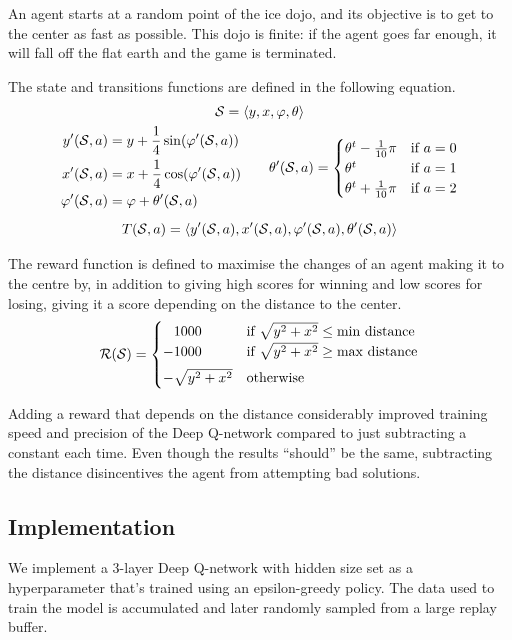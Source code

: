An agent starts at a random point of the ice dojo, and its objective is to get to the center as fast as possible.
This dojo is finite: if the agent goes far enough, it will fall off the flat earth and the game is terminated.

The state and transitions functions are defined in the following equation.
\newcommand{\statet}{\left< y, x, \varphi, \theta \right>}
\begin{gather*}
	\state = \statet \\
	\begin{aligned}
		y'(\state, a) &= y + \frac{1}{4} \sin(\varphi'(\state, a)) \\
		x'(\state, a) &= x + \frac{1}{4} \cos(\varphi'(\state, a)) \\
		\varphi'(\state, a) &= \varphi + \theta'(\state, a)
	\end{aligned}
	\qquad
	\theta'(\state, a)= \begin{cases}
		\theta^t - \frac{1}{10} \pi & \text{if } a = 0 \\
		\theta^t & \text{if } a = 1 \\
		\theta^t + \frac{1}{10} \pi & \text{if } a = 2
	\end{cases} \\[1ex]
	T(\state, a) = \left< y'(\state, a), x'(\state, a), \varphi'(\state, a), \theta'(\state, a) \right>
\end{gather*}

The reward function is defined to maximise the changes of an agent making it to the centre by, in addition to giving high scores for winning and low scores for losing, giving it a score depending on the distance to the center.
\begin{equation*}
	\mathcal{R}(\mathcal{S}) = \begin{cases}
		\phantom{+}1000 & \text{if } \sqrt{y^2 + x^2} \leq \text{min distance} \\
		-1000 & \text{if } \sqrt{y^2 + x^2} \geq \text{max distance} \\[1ex]
		-\sqrt{y^2 + x^2} & \text{otherwise}
	\end{cases}
\end{equation*}

Adding a reward that depends on the distance considerably improved training speed and precision of the Deep Q-network compared to just subtracting a constant each time.
Even though the results ``should'' be the same, subtracting the distance disincentives the agent from attempting bad solutions.

\subsection{Implementation}
We implement a 3-layer Deep Q-network with hidden size set as a hyperparameter that's trained using an epsilon-greedy policy.
The data used to train the model is accumulated and later randomly sampled from a large replay buffer.

